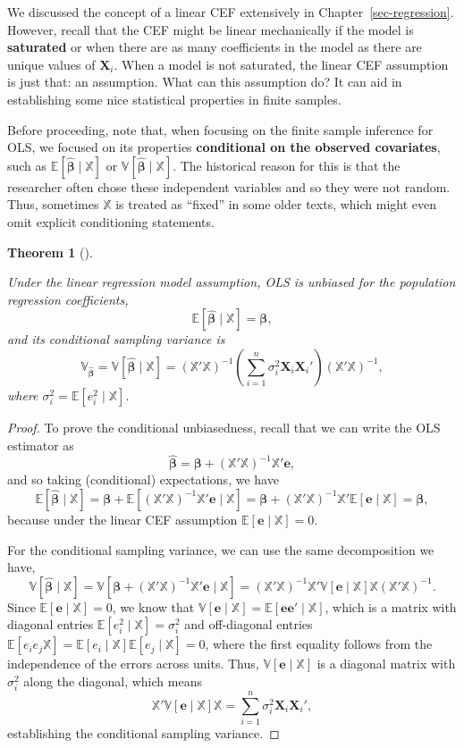 \documentclass[
  13pt,
  letterpaper,
  DIV=11,
  numbers=noendperiod]{scrreprt}
\newcommand{\mb}{\symbf}
\newcommand{\E}{\mathbb{E}}
\newcommand{\V}{\mathbb{V}}
\newcommand{\X}{\mb{X}}
\newcommand{\Xmat}{\mathbb{X}}
\newcommand{\bfbeta}{\mb{\beta}}
\newcommand{\bhat}{\widehat{\mb{\beta}}}
\theoremstyle{definition}
\theoremstyle{definition}
\theoremstyle{plain}
\newtheorem{theorem}{Theorem}[chapter]
\theoremstyle{remark}
\begin{document}
We discussed the concept of a linear CEF extensively in
Chapter~\ref{sec-regression}. However, recall that the CEF might be
linear mechanically if the model is \textbf{saturated} or when there are
as many coefficients in the model as there are unique values of
\(\X_i\). When a model is not saturated, the linear CEF assumption is
just that: an assumption. What can this assumption do? It can aid in
establishing some nice statistical properties in finite samples.

Before proceeding, note that, when focusing on the finite sample
inference for OLS, we focused on its properties \textbf{conditional on
the observed covariates}, such as \(\E[\bhat \mid \Xmat]\) or
\(\V[\bhat \mid \Xmat]\). The historical reason for this is that the
researcher often chose these independent variables and so they were not
random. Thus, sometimes \(\Xmat\) is treated as ``fixed'' in some older
texts, which might even omit explicit conditioning statements.

\begin{theorem}[]\protect\hypertarget{thm-ols-unbiased}{}\label{thm-ols-unbiased}

Under the linear regression model assumption, OLS is unbiased for the
population regression coefficients, \[
\E[\bhat \mid \Xmat] = \bfbeta,
\] and its conditional sampling variance is \[
\mb{\V}_{\bhat} = \V[\bhat \mid \Xmat] = \left( \Xmat'\Xmat \right)^{-1}\left( \sum_{i=1}^n \sigma^2_i \X_i\X_i' \right) \left( \Xmat'\Xmat \right)^{-1},
\] where \(\sigma^2_{i} = \E[e_{i}^{2} \mid \Xmat]\).

\end{theorem}

\begin{proof}
To prove the conditional unbiasedness, recall that we can write the OLS
estimator as \[
\bhat = \bfbeta + (\Xmat'\Xmat)^{-1}\Xmat'\mb{e},
\] and so taking (conditional) expectations, we have \[
\E[\bhat \mid \Xmat] = \bfbeta + \E[(\Xmat'\Xmat)^{-1}\Xmat'\mb{e} \mid \Xmat] = \bfbeta + (\Xmat'\Xmat)^{-1}\Xmat'\E[\mb{e} \mid \Xmat] = \bfbeta,
\] because under the linear CEF assumption \(\E[\mb{e}\mid \Xmat] = 0\).

For the conditional sampling variance, we can use the same decomposition
we have, \[
\V[\bhat \mid \Xmat] = \V[\bfbeta + (\Xmat'\Xmat)^{-1}\Xmat'\mb{e} \mid \Xmat] = (\Xmat'\Xmat)^{-1}\Xmat'\V[\mb{e} \mid \Xmat]\Xmat(\Xmat'\Xmat)^{-1}. 
\] Since \(\E[\mb{e}\mid \Xmat] = 0\), we know that
\(\V[\mb{e}\mid \Xmat] = \E[\mb{ee}' \mid \Xmat]\), which is a matrix
with diagonal entries \(\E[e_{i}^{2} \mid \Xmat] = \sigma^2_i\) and
off-diagonal entries
\(\E[e_{i}e_{j} \Xmat] = \E[e_{i}\mid \Xmat]\E[e_{j}\mid\Xmat] = 0\),
where the first equality follows from the independence of the errors
across units. Thus, \(\V[\mb{e} \mid \Xmat]\) is a diagonal matrix with
\(\sigma^2_i\) along the diagonal, which means \[
\Xmat'\V[\mb{e} \mid \Xmat]\Xmat = \sum_{i=1}^n \sigma^2_i \X_i\X_i',
\] establishing the conditional sampling variance.
\end{proof}
\end{document}
